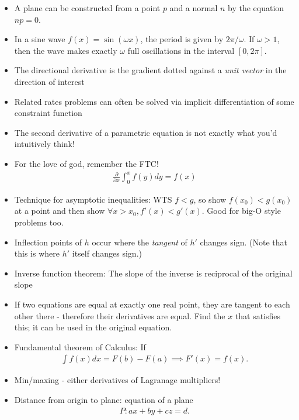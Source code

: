 \begin{itemize}
  \begin{itemize}
  \item
    You can always just read off the normal vector
    \(\vector{n} = (a,b,c)\). So we have \(\mathbf{n}\mathbf{x} = d\).
  \item
    Since \(\lambda \mathbf{n}\) is normal to \(P\) for all \(\lambda\),
    solve \(\mathbf{n}\lambda \mathbf{n} = d\), which is
    \(\lambda = \frac{d}{ \norm{\vector n}^2}\)
  \end{itemize}
\item
  A plane can be constructed from a point \(p\) and a normal \(n\) by
  the equation \(np = 0\).
\item
  In a sine wave \(f(x) = \sin(\omega x)\), the period is given by
  \(2\pi/\omega\). If \(\omega > 1\), then the wave makes exactly
  \(\omega\) full oscillations in the interval \([0, 2\pi]\).
\item
  The directional derivative is the gradient dotted against a \emph{unit
  vector} in the direction of interest
\item
  Related rates problems can often be solved via implicit
  differentiation of some constraint function
\item
  The second derivative of a parametric equation is not exactly what
  you'd intuitively think!
\item
  For the love of god, remember the FTC!
  \begin{align*}
  \frac{\partial}{\partial x} \int_0^x f(y) dy = f(x)
  \end{align*}
\item
  Technique for asymptotic inequalities: WTS \(f < g\), so show
  \(f(x_0) < g(x_0)\) at a point and then show
  \(\forall x > x_0, f'(x) < g'(x)\). Good for big-O style problems too.
\item
  Inflection points of \(h\) occur where the \emph{tangent} of \(h'\)
  changes sign. (Note that this is where \(h'\) itself changes sign.)
\item
  Inverse function theorem: The slope of the inverse is reciprocal of
  the original slope
\item
  If two equations are equal at exactly one real point, they are tangent
  to each other there - therefore their derivatives are equal. Find the
  \(x\) that satisfies this; it can be used in the original equation.
\item
  Fundamental theorem of Calculus: If
  \begin{align*}  
  \int f(x) dx = F(b) - F(a) \implies F'(x) = f(x)
  .\end{align*}
\item
  Min/maxing - either derivatives of Lagranage multipliers!
\item
  Distance from origin to plane: equation of a plane
  \begin{align*}  
  P: ax+by+cz=d
  .\end{align*}
\end{itemize}

